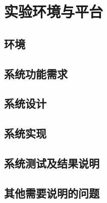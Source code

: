 
\section{实验环境与平台}
\subsection{环境}


\subsection{系统功能需求}


\subsection{系统设计}


\subsection{系统实现}


\subsection{系统测试及结果说明}


\subsection{其他需要说明的问题}